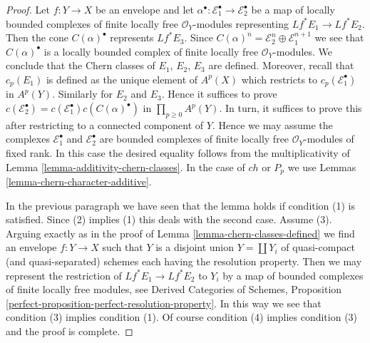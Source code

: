 \documentclass[10pt,a4paper]{amsart}
\theoremstyle{plain}
\theoremstyle{definition}
\theoremstyle{remark}
\numberwithin{equation}{subsection}
\begin{document}
\begin{proof}
Let $f : Y \to X$ be an envelope and let
$\alpha^\bullet : \mathcal{E}_1^\bullet \to \mathcal{E}_2^\bullet$
be a map of locally bounded complexes of finite locally free
$\mathcal{O}_Y$-modules representing $Lf^*E_1 \to Lf^*E_2$.
Then the cone $C(\alpha)^\bullet$ represents $Lf^*E_3$. Since
$C(\alpha)^n = \mathcal{E}_2^n \oplus \mathcal{E}_1^{n + 1}$
we see that $C(\alpha)^\bullet$ is a locally bounded complex
of finite locally free $\mathcal{O}_Y$-modules.
We conclude that the Chern classes of $E_1$, $E_2$, $E_3$
are defined. Moreover, recall that $c_p(E_1)$ is defined
as the unique element of $A^p(X)$ which restricts to
$c_p(\mathcal{E}_1^\bullet)$ in $A^p(Y)$. Similarly for
$E_2$ and $E_3$. Hence it suffices
to prove $c(\mathcal{E}_2^\bullet) =
c(\mathcal{E}_1^\bullet) c(C(\alpha)^\bullet)$
in $\prod_{p \geq 0} A^p(Y)$.
In turn, it suffices to prove this after restricting
to a connected component of $Y$. Hence we may assume
the complexes $\mathcal{E}_1^\bullet$ and $\mathcal{E}_2^\bullet$
are bounded complexes of finite locally free $\mathcal{O}_Y$-modules
of fixed rank. In this case the desired equality follows from the
multiplicativity of Lemma \ref{lemma-additivity-chern-classes}.
In the case of $ch$ or $P_p$ we use
Lemmas \ref{lemma-chern-character-additive}.

\medskip\noindent
In the previous paragraph we have seen that the lemma holds if
condition (1) is satisfied. Since (2) implies (1) this deals with
the second case. Assume (3). Arguing exactly as in the proof of
Lemma \ref{lemma-chern-classes-defined} we find an envelope
$f : Y \to X$ such that $Y$ is a disjoint union $Y = \coprod Y_i$
of quasi-compact (and quasi-separated) schemes each having the
resolution property. Then we may represent the restriction of
$Lf^*E_1 \to Lf^*E_2$ to $Y_i$ by a map of bounded complexes
of finite locally free modules, see
Derived Categories of Schemes, Proposition
\ref{perfect-proposition-perfect-resolution-property}.
In this way we see that condition (3) implies condition (1).
Of course condition (4) implies condition (3) and the proof
is complete.
\end{proof}
\end{document}
